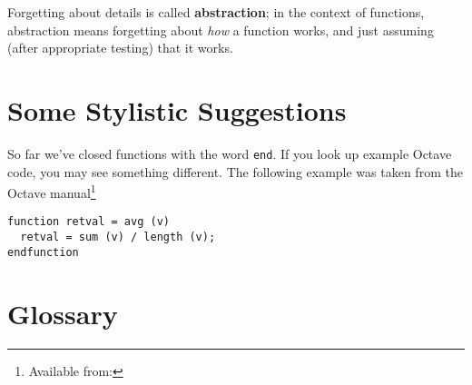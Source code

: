 Forgetting about details is called {\bf abstraction}; in the context
of functions, abstraction means forgetting about {\em how} a function
works, and just assuming (after appropriate testing) that it works.

\section{Some Stylistic Suggestions}
\label{style1}

So far we've closed functions with the word {\tt end}. If you look up
example Octave code, you may see something different. The following example was
taken from the Octave manual\footnote{Available from: }
%
\begin{verbatim}
function retval = avg (v)
  retval = sum (v) / length (v);
endfunction
\end{verbatim}
%

\section{Glossary}

